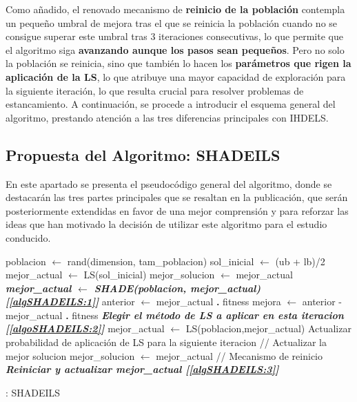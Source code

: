 Como añadido, el renovado mecanismo de \textbf{reinicio de la población} contempla un pequeño umbral de mejora tras el que se reinicia la población cuando no se consigue superar este umbral tras 3 iteraciones consecutivas, lo que permite que el algoritmo siga \textbf{avanzando aunque los pasos sean pequeños}. Pero no solo la población se reinicia, sino que también lo hacen los \textbf{parámetros que rigen la aplicación de la LS}, lo que atribuye una mayor capacidad de exploración para la siguiente iteración, lo que resulta crucial para resolver problemas de estancamiento. A continuación, se procede a introducir el esquema general del algoritmo, prestando atención a las tres diferencias principales con IHDELS.

\subsection{Propuesta del Algoritmo: SHADEILS}

En este apartado se presenta el pseudocódigo general del algoritmo, donde se destacarán las tres partes principales que se resaltan en la publicación, que serán posteriormente extendidas en favor de una mejor comprensión y para reforzar las ideas que han motivado la decisión de utilizar este algoritmo para el estudio conducido.

\begin{algorithm}[h]
	\begin{algorithmic}[1]
		\STATE poblacion $\leftarrow$ rand(dimension, tam\_poblacion)
		\STATE sol\_inicial  $\leftarrow$ (ub + lb)/2
		\STATE mejor\_actual $\leftarrow$ LS(sol\_inicial)
		\STATE mejor\_solucion $\leftarrow$ mejor\_actual
			\STATE \textit{\textbf{mejor\_actual $\leftarrow$ SHADE(poblacion, mejor\_actual) [\ref{algSHADEILS:1}]}}
			\STATE anterior $\leftarrow$ mejor\_actual \textbf{.} fitness 
			\STATE mejora $\leftarrow$ anterior - mejor\_actual \textbf{.} fitness
			\STATE \textit{\textbf{Elegir el método de LS a aplicar en esta iteracion [\ref{algoSHADEILS:2}]}}
			\STATE mejor\_actual $\leftarrow$ LS(poblacion,mejor\_actual)
			\STATE Actualizar probabilidad de aplicación de LS para la siguiente iteracion
			\STATE // Actualizar la mejor solucion
				\STATE mejor\_solucion $\leftarrow$ mejor\_actual
			\ENDIF
			\STATE // Mecanismo de reinicio
				\STATE \textit{\textbf{Reiniciar y actualizar mejor\_actual [\ref{algSHADEILS:3}]}}
			\ENDIF
			
		\ENDWHILE
		
	\end{algorithmic}
	\caption{: SHADEILS} \label{Alg: SHADEILS}
\end{algorithm}

